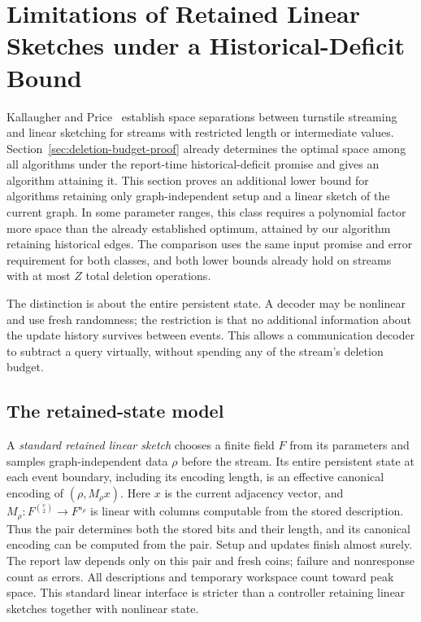 \documentclass[11pt,letterpaper]{article}
\numberwithin{equation}{section}
\begin{document}
\section{Limitations of Retained Linear Sketches under a Historical-Deficit Bound}
\label{sec:retained-linear-limitations}

Kallaugher and Price~\cite{KP20} establish space separations between turnstile streaming and linear sketching for streams with restricted length or intermediate values.
Section~\ref{sec:deletion-budget-proof} already determines the optimal space among all algorithms under the report-time historical-deficit promise and gives an algorithm attaining it.
This section proves an additional lower bound for algorithms retaining only graph-independent setup and a linear sketch of the current graph.
In some parameter ranges, this class requires a polynomial factor more space than the already established optimum, attained by our algorithm retaining historical edges.
The comparison uses the same input promise and error requirement for both classes, and both lower bounds already hold on streams with at most $Z$ total deletion operations.

The distinction is about the entire persistent state.
A decoder may be nonlinear and use fresh randomness; the restriction is that no additional information about the update history survives between events.
This allows a communication decoder to subtract a query virtually, without spending any of the stream's deletion budget.

\subsection{The retained-state model}
\label{sec:retained-state-model}
A \emph{standard retained linear sketch} chooses a finite field $F$ from its parameters and samples graph-independent data $\rho$ before the stream.
Its entire persistent state at each event boundary, including its encoding length, is an effective canonical encoding of $(\rho,M_\rho x)$.
Here $x$ is the current adjacency vector, and $M_\rho:F^{\binom{v}{2}}\to F^{s_\rho}$ is linear with columns computable from the stored description.
Thus the pair determines both the stored bits and their length, and its canonical encoding can be computed from the pair.
Setup and updates finish almost surely.
The report law depends only on this pair and fresh coins; failure and nonresponse count as errors.
All descriptions and temporary workspace count toward peak space.
This standard linear interface is stricter than a controller retaining linear sketches together with nonlinear state.
\end{document}
